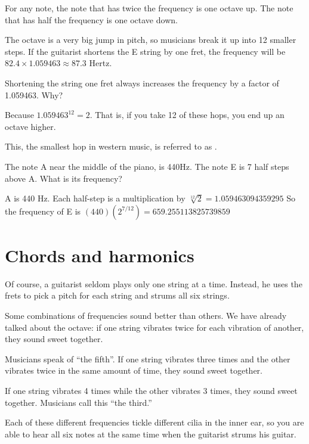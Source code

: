 For any note, the note that has twice the frequency is one octave
up. The note that has half the frequency is one octave down.

The octave is a very big jump in pitch, so musicians break it up into
12 smaller steps. If the guitarist shortens the E string by one fret,
the frequency will be $82.4 \times 1.059463 \approx 87.3$ Hertz. 

Shortening the string one fret always increases the frequency by a factor of 1.059463. Why?

Because $1.059463^12 = 2$. That is, if you take 12 of these hops, you
end up an octave higher.

This, the smallest hop in western music, is referred to as .

\begin{Exercise}[title={Notes and frequecies}, label=note_to_frequency]

The note A near the middle of the piano, is 440Hz. The note E is 7 half steps above A.  What is its frequency?
 
\end{Exercise}
\begin{Answer}[ref=note_to_frequency]

  A is 440 Hz.  Each half-step is a multiplication by $\sqrt[12]{2} = 1.059463094359295$
  So the frequency of E is $(440)(2^{7/12}) = 659.255113825739859$

\end{Answer}


\section{Chords and harmonics}

Of course, a guitarist seldom plays only one string at a
time. Instead, he uses the frets to pick a pitch for each string and
strums all six strings.

Some combinations of frequencies sound better than others. We have
already talked about the octave: if one string vibrates twice for each
vibration of another, they sound sweet together.

Musicians speak of ``the fifth''.  If one string vibrates three times
and the other vibrates twice in the same amount of time, they sound
sweet together.

If one string vibrates 4 times while the other vibrates 3 times, they
sound sweet together. Musicians call this ``the third.''

Each of these different frequencies tickle different cilia in the
inner ear, so you are able to hear all six notes at the same time when
the guitarist strums his guitar.

